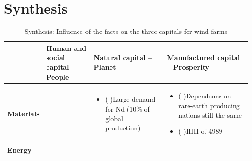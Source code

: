 \documentclass[11pt]{article}
\begin{document}
\section*{Synthesis}
\begin{table}[h]
\centering
\small
\caption{Synthesis: Influence of the facts on the three capitals for wind farms}
\begin{tabular}{p{} p{} p{} p{}}
\hline
 & \textbf{Human and social capital – People} & \textbf{Natural capital – Planet} & \textbf{Manufactured capital – Prosperity} \\
\hline
\textbf{Materials} &

&
\begin{itemize}[label={}]
  \item (-)Large demand for Nd (10\% of global production)
\end{itemize}
&
\begin{itemize}[label={}]
  \item (-)Dependence on rare-earth producing nations still the same
  \item (-)HHI of 4989
\end{itemize}
\\
\hline
\textbf{Energy} &


\end{tabular}
\end{table}
\end{document}
